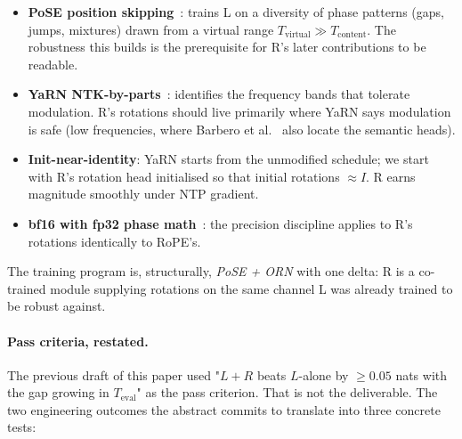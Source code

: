 \documentclass[10pt, twocolumn, a4paper]{article}
\begin{document}
\begin{itemize}[nosep,leftmargin=1.5em]
\item \textbf{PoSE position skipping}~\cite{zhu2024pose}: trains L on a diversity of phase patterns (gaps, jumps, mixtures) drawn from a virtual range $T_{\text{virtual}} \gg T_{\text{content}}$. The robustness this builds is the prerequisite for R's later contributions to be readable.
\item \textbf{YaRN NTK-by-parts}~\cite{peng2023yarn}: identifies the frequency bands that tolerate modulation. R's rotations should live primarily where YaRN says modulation is safe (low frequencies, where Barbero et al.~\cite{barbero2025round} also locate the semantic heads).
\item \textbf{Init-near-identity}: YaRN starts from the unmodified schedule; we start with R's rotation head initialised so that initial rotations $\approx I$. R earns magnitude smoothly under NTP gradient.
\item \textbf{bf16 with fp32 phase math}~\cite{wang2024bf16rope}: the precision discipline applies to R's rotations identically to RoPE's.
\end{itemize}

The training program is, structurally, \emph{PoSE + ORN} with one delta: R is a co-trained module supplying rotations on the same channel L was already trained to be robust against.

\paragraph{Pass criteria, restated.} The previous draft of this paper used "$L+R$ beats $L$-alone by $\ge 0.05$ nats with the gap growing in $T_{\text{eval}}$" as the pass criterion. That is not the deliverable. The two engineering outcomes the abstract commits to translate into three concrete tests:
\end{document}
